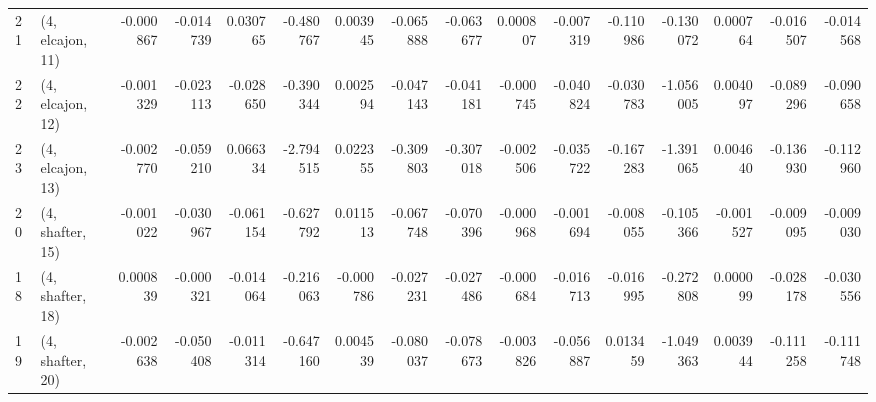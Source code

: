 \begin{tabular}{llrrrrrrrrrrrrrr}
21 &  (4, elcajon, 11) &  -0.000867 & -0.014739 &  0.030765 &  -0.480767 &  0.003945 &  -0.065888 & -0.063677 &  0.000807 & -0.007319 & -0.110986 &  -0.130072 &  0.000764 & -0.016507 & -0.014568 \\
22 &  (4, elcajon, 12) &  -0.001329 & -0.023113 & -0.028650 &  -0.390344 &  0.002594 &  -0.047143 & -0.041181 & -0.000745 & -0.040824 & -0.030783 &  -1.056005 &  0.004097 & -0.089296 & -0.090658 \\
23 &  (4, elcajon, 13) &  -0.002770 & -0.059210 &  0.066334 &  -2.794515 &  0.022355 &  -0.309803 & -0.307018 & -0.002506 & -0.035722 & -0.167283 &  -1.391065 &  0.004640 & -0.136930 & -0.112960 \\
20 &  (4, shafter, 15) &  -0.001022 & -0.030967 & -0.061154 &  -0.627792 &  0.011513 &  -0.067748 & -0.070396 & -0.000968 & -0.001694 & -0.008055 &  -0.105366 & -0.001527 & -0.009095 & -0.009030 \\
18 &  (4, shafter, 18) &   0.000839 & -0.000321 & -0.014064 &  -0.216063 & -0.000786 &  -0.027231 & -0.027486 & -0.000684 & -0.016713 & -0.016995 &  -0.272808 &  0.000099 & -0.028178 & -0.030556 \\
19 &  (4, shafter, 20) &  -0.002638 & -0.050408 & -0.011314 &  -0.647160 &  0.004539 &  -0.080037 & -0.078673 & -0.003826 & -0.056887 &  0.013459 &  -1.049363 &  0.003944 & -0.111258 & -0.111748 \\
\bottomrule
\end{tabular}
